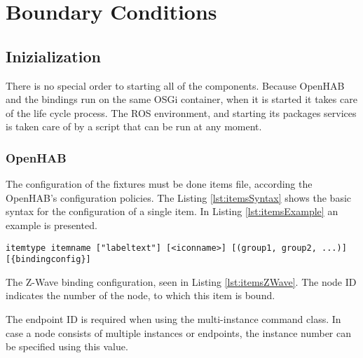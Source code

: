 



\section{Boundary Conditions}

\subsection{Inizialization}
There is no special order to starting all of the components. Because OpenHAB and the bindings run on the same OSGi container, when it is started it takes care of the life cycle process. The ROS environment, and starting its packages services is taken care of by a script that can be run at any moment. 


\subsubsection{OpenHAB}

The configuration of the fixtures must be done items file, according the OpenHAB's configuration policies. The Listing \ref{lst:itemsSyntax} shows the basic syntax for the configuration of a single item.  In Listing \ref{lst:itemsExample} an example is presented.

\begin{lstlisting}[caption=Item configuration sintax,label={lst:itemsSyntax}]
itemtype itemname ["labeltext"] [<iconname>] [(group1, group2, ...)] [{bindingconfig}]
\end{lstlisting}

The Z-Wave binding configuration, seen in Listing \ref{lst:itemsZWave}. The node ID indicates the number of the node, to which this item is bound.

The endpoint ID is required when using the multi-instance command class. In case a node consists of multiple instances or endpoints, the instance number can be specified using this value. 

